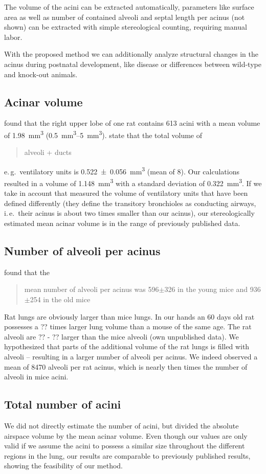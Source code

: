 \documentclass[a4paper,DIV=calc,abstract,english]{scrartcl}
\newcommand{\ie}{i.\,e.\ }
\newcommand{\eg}{e.\,g.\ }
\newcommand{\meanacinarvolume}{1.148} %
\newcommand{\meanacinarvolumeSTD}{0.322} %
\newcommand{\meannumberofalveoli}{8470} %
\begin{document}
The volume of the acini can be extracted automatically, parameters like surface area as well as number of contained alveoli and septal length per acinus (not shown) can be extracted with simple stereological counting, requiring manual labor.

With the proposed method we can additionally analyze structural changes in the acinus during postnatal development, like disease or differences between wild-type and knock-out animals.

\subsection{Acinar volume}
\citet{Rodriguez1987} found that the right upper lobe of one rat contains 613 acini with a mean volume of \SI{1.98}{\milli\meter\cubed} (\SIrange{0.5}{5}{\milli\meter\cubed}).
\citet{Mercer1987a} state that the total volume of \blockquote{alveoli + ducts} \eg ventilatory units is \SI{0.522(56)}{\milli\meter\cubed} (mean of 8). %
Our calculations resulted in a volume of \SI{\meanacinarvolume}{\milli\meter\cubed} with a standard deviation of \SI{\meanacinarvolumeSTD}{\milli\meter\cubed}.
If we take in account that \citep{Mercer1987a} measured the volume of ventilatory units that have been defined differently (they define the transitory bronchioles as conducting airways, \ie their acinus is about two times smaller than our acinus), our stereologically estimated mean acinar volume is in the range of previously published data.

\subsection{Number of alveoli per acinus}
\citet{Vasilescu2012} found that the \blockquote{mean number of alveoli per acinus was 596\(\pm\)326 in the young mice and 936\(\pm\)254 in the old mice}.
Rat lungs are obviously larger than mice lungs.
In our hands  an 60 days old rat possesses a ?? times larger lung volume than a mouse of the same age.
The rat alveoli are ?? - ?? larger than the mice alveoli (own unpublished data). We hypothesized that parts of the additional volume of the rat lungs is filled with alveoli – resulting in a larger number of alveoli per acinus.
We indeed observed a mean of \meannumberofalveoli\xspace alveoli per rat acinus, which is nearly then times the number of alveoli in mice acini. 

\subsection{Total number of acini}
We did not directly estimate the number of acini, but divided the absolute airspace volume\citep{Tschanz2003} by the mean acinar volume. Even though our values are only valid if we assume the acini to possess a similar size throughout the different regions in the lung, our results are comparable to previously published results, showing the feasibility of our method.
\end{document}
